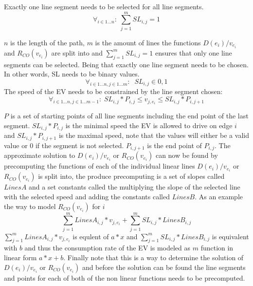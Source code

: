 Exactly one line segment needs to be selected for all line segments. 
\begin{equation*}
\forall_{i\in1 \dots n }:\; \sum_{j=1}^{m} SL_{i,j} = 1
\end{equation*}

$n$ is the length of the path, $m$ is the amount of lines the functions \( D(e_i)/v_{e_i} \) and $R_{CO}(v_{e_i})$ are split into and $\sum_{j=1}^{m} SL_{i,j} = 1$ ensures that only one line segments can be selected.
Being that exactly one line segment needs to be chosen. In other words, SL needs to be binary values.
\begin{equation*}
\forall_{i\in1 \dots n, j \in 1 \dots m}: \; \; SL_{i,j} \in{0,1} 
\end{equation*}
The speed of the EV needs to be constrained by the line segment chosen:
\begin{equation*}
\forall_{i\in1 \dots n, j \in 1 \dots m-1}:\; SL_{i,j} * P_{i,j}  \le  v_{j,e_i} \le SL_{i,j}*P_{i,j+1}
\end{equation*}

$P$ is a set of starting points of all line segments including the end point of the last segment. $SL_{i,j} * P_{i,j}$ is the minimal speed the EV is allowed to drive on edge $i$ and $SL_{i,j}*P_{i,j+1}$ is the maximal speed, note that the values will either be a valid value or $0$ if the segment is not selected. $P_{i,j+1}$ is the end point of $P_{i,j}$. 
The approximate solution to \( D(e_i)/v_{e_i} \) or $R_{CO}(v_{e_i})$ can now be found by precomputing the functions of each of the individual linear lines \( D(e_i)/v_{e_i} \) or $R_{CO}(v_{e_i})$ is split into, the produce precomputing is a set of slopes called $LinesA$ and a set constants called  the  multiplying the slope of the selected line with the selected speed and adding the constants called $LinesB$. As an example the way to model $R_{CO}(v_{e_i})$ for $i$
\begin{equation*}
\sum_{j=1}^{m} LinesA_{i,j}*v_{j,e_i} + \sum_{j=1}^{m} SL_{i,j}*LinesB_{i,j} 
\end{equation*}
$\sum_{j=1}^{m} LinesA_{i,j}*v_{j,e_i}$ is equlent of $a*x$ and $\sum_{j=1}^{m} SL_{i,j}*LinesB_{i,j}$ is equivalent with $b$ and thus the consumption rate of the EV is modeled as $m$ function in linear form $a*x + b$. 
Finally note that this is a way to determine the solution of \( D(e_i)/v_{e_i} \) or $R_{CO}(v_{e_i})$ and before the solution can be found the line segments and points for each of both of the non linear functions needs to be precomputed. 


